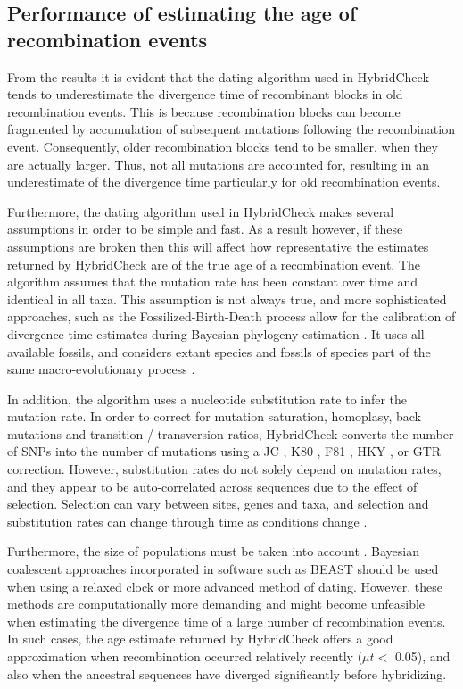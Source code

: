 \subsection{Performance of estimating the age of recombination events}
From the results it is evident that the dating algorithm used in HybridCheck tends to underestimate the divergence time of recombinant blocks in old recombination events. This is because recombination blocks can become fragmented by accumulation of subsequent mutations following the recombination event. Consequently, older recombination blocks tend to be smaller, when they are actually larger. Thus, not all mutations are accounted for, resulting in an underestimate of the divergence time particularly for old recombination events.

Furthermore, the dating algorithm used in HybridCheck makes several assumptions in order to be simple and fast. As a result however, if these assumptions are broken then this will affect how representative the estimates returned by HybridCheck are of the true age of a recombination event. The algorithm assumes that the mutation rate has been constant over time and identical in all taxa. This assumption is not always true, and more sophisticated approaches, such as the Fossilized-Birth-Death process allow for the calibration of divergence time estimates during Bayesian phylogeny estimation \parencite{Heath2014}. It uses all available fossils, and considers extant species and fossils of species part of the same macro-evolutionary process \parencite{Heath2014}.

In addition, the algorithm uses a nucleotide substitution rate to infer the mutation rate. In order to correct for mutation saturation, homoplasy, back mutations and transition / transversion ratios, HybridCheck converts the number of SNPs into the number of mutations using a JC \parencite{Jukes1969}, K80 \parencite{Kimura1980ASequences}, F81 \parencite{Felsenstein1981EvolutionaryApproach}, HKY \parencite{Hasegawa1985DatingDNA}, or GTR \parencite{Tavare1986SomeSequences} correction. However, substitution rates do not solely depend on mutation rates, and they appear to be auto-correlated across sequences due to the effect of selection. Selection can vary between sites, genes and taxa, and selection and substitution rates can change through time as conditions change \parencite{Barrick2013,Bromham2003a}.

Furthermore, the size of populations must be taken into account \parencite{Bromham2003a}. Bayesian coalescent approaches incorporated in software such as BEAST \parencite{Bouckaert2014BEASTAnalysis} should be used when using a relaxed clock or more advanced method of dating. However, these methods are computationally more demanding and might become unfeasible when estimating the divergence time of a large number of recombination events. In such cases, the age estimate returned by HybridCheck offers a good approximation when recombination occurred relatively recently ($\mu t <$ 0.05), and also when the ancestral sequences have diverged significantly before hybridizing.

